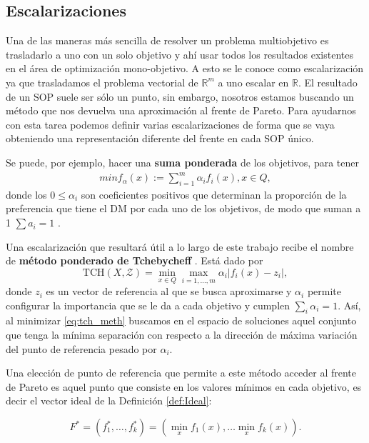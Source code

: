 \subsection{Escalarizaciones} \label{sec:Escalarizaciones}

Una de las maneras más sencilla de resolver un problema multiobjetivo es trasladarlo a uno con un solo objetivo y ahí usar todos los resultados existentes en el área de optimización mono-objetivo. A esto se le conoce como escalarización ya que trasladamos el problema vectorial de $\mathbb{R}^m$ a uno escalar en $\mathbb{R}$. El resultado de un SOP suele ser sólo un punto, sin embargo, nosotros estamos buscando un método que nos devuelva una aproximación al frente de Pareto. Para ayudarnos con esta tarea podemos definir varias escalarizaciones de forma que se vaya obteniendo una representación diferente del frente en cada SOP único.

Se puede, por ejemplo, hacer una \textbf{suma ponderada} \cite{zadehOptimalityNonscalarvaluedPerformance1963} de los objetivos, para tener
\begin{align} \label{eq:suma_ponderada}
    min f_\alpha(x):=\sum_{i=1}^m \alpha_i f_i(x), x\in Q,
\end{align}
donde los $0\leq \alpha_i$ son coeficientes positivos que determinan la proporción de la preferencia que tiene el DM por cada uno de los objetivos, de modo que suman a 1 $\sum a_i=1$ . 

Una escalarización que resultará útil a lo largo de este trabajo recibe el nombre de \textbf{método ponderado de Tchebycheff} \cite{bowmanRelationshipTchebycheffNorm1976}. Está dado por
\begin{equation} \label{eq:tch_meth}
    \text{TCH}(X,\mathcal{Z}) = \min_{x\in Q} \max_{i=1,\ldots,m} \alpha_i |f_i(x)-z_i|,
\end{equation}
donde $z_i$ es un vector de referencia al que se busca aproximarse y $\alpha_i$ permite configurar la importancia  que se le da a cada objetivo y cumplen $\sum_i \alpha_i = 1$. Así, al minimizar \ref{eq:tch_meth}  buscamos en el espacio de soluciones aquel conjunto que tenga la mínima separación con respecto a la dirección de máxima variación del punto de referencia pesado por $\alpha_i$. 

Una elección de punto de referencia  que permite a este método acceder al frente de Pareto es aquel punto que consiste en los valores mínimos en cada objetivo, es decir el vector ideal de la Definición \ref{def:Ideal}:

\begin{equation} \label{eq:vector_utopico}
    F^*=(f_1^*,\ldots,f_k^*)=(\min_x f_1(x), \ldots \min_x f_k(x)). \nonumber
\end{equation}

